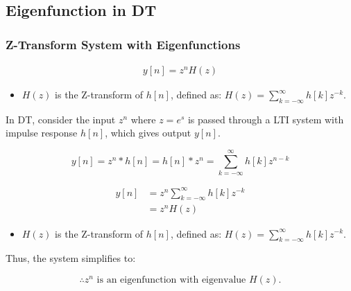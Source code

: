 \subsection{Eigenfunction in DT}
\subsubsection{Z-Transform System with Eigenfunctions}
\begin{definition}
    \begin{align*}
        y[n] = z^n H(z)
    \end{align*}
    
    \begin{itemize}
        \item \( H(z) \) is the Z-transform of \( h[n] \), defined as: $H(z) = \sum_{k=-\infty}^{\infty} h[k] z^{-k}$.
    \end{itemize}
\end{definition}
\begin{derivation}
    In DT, consider the input \( z^n \) where \( z = e^{s} \) is passed through a LTI system with impulse response \( h[n] \), which gives output \( y[n] \).

    \begin{center}
    \end{center}

    \[
    y[n] = z^n \ast h[n] = h[n] \ast z^n = \sum_{k=-\infty}^{\infty} h[k] z^{n-k}
    \]

    \begin{align*}
    y[n] &= z^n \sum_{k=-\infty}^{\infty} h[k] z^{-k} \\
    &= z^n H(z)
    \end{align*}

    \begin{itemize}
        \item \( H(z) \) is the Z-transform of \( h[n] \), defined as: $H(z) = \sum_{k=-\infty}^{\infty} h[k] z^{-k}$.
    \end{itemize}

    Thus, the system simplifies to:

    \begin{center}
    \end{center}

    \[
    \therefore z^n \text{ is an eigenfunction with eigenvalue } H(z).
    \]
\end{derivation}

